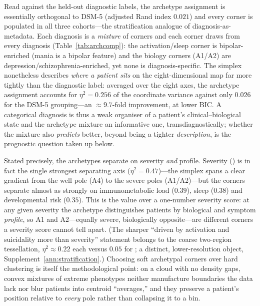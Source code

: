 Read against the held-out diagnostic labels, the archetype assignment is essentially
orthogonal to DSM-5 (adjusted Rand index $0.021$) and every corner is populated in all three
cohorts---the stratification analogue of diagnosis-as-metadata. Each diagnosis is a
\emph{mixture} of corners and each corner draws from every diagnosis (Table~\ref{tab:archcomp}):
the activation/sleep corner is bipolar-enriched (mania is a bipolar feature) and the biology
corners (A1/A2) are depression/schizophrenia-enriched, yet none is diagnosis-specific. The
simplex nonetheless describes \emph{where a patient sits} on the eight-dimensional map far more
tightly than the diagnostic label: averaged over the eight axes, the archetype assignment
accounts for $\eta^2=0.256$ of the coordinate variance against only $0.026$ for the DSM-5
grouping---an $\approx\!9.7$-fold improvement, at lower BIC. A categorical diagnosis is thus a
weak organiser of a patient's clinical--biological state and the archetype mixture an informative
one, transdiagnostically; whether the mixture also \emph{predicts} better, beyond being a tighter
\emph{description}, is the prognostic question taken up below.

Stated precisely, the archetypes separate on severity \emph{and} profile. Severity (\Gfac) is in
fact the single strongest separating axis ($\eta^2=0.47$)---the simplex spans a clear gradient
from the well pole (A4) to the severe poles (A1/A2)---but the corners separate almost as strongly
on immunometabolic load ($0.39$), sleep ($0.38$) and developmental risk ($0.35$). This is the
value over a one-number severity score: at any given severity the archetype distinguishes patients
by biological and symptom \emph{profile}, so A1 and A2---equally severe, biologically opposite---are
different corners a severity score cannot tell apart. (The sharper ``driven by activation and
suicidality more than severity'' statement belongs to the coarse two-region tessellation,
$\eta^2\approx0.22$ each versus $0.05$ for \Gfac{}; a distinct, lower-resolution object,
Supplement~\ref{ann:stratification}.) Choosing soft archetypal corners over hard clustering is
itself the methodological point: on a cloud with no density gaps, convex mixtures of extreme
phenotypes neither manufacture boundaries the data lack nor blur patients into centroid
``averages,'' and they preserve a patient's position relative to \emph{every} pole rather than
collapsing it to a bin.

